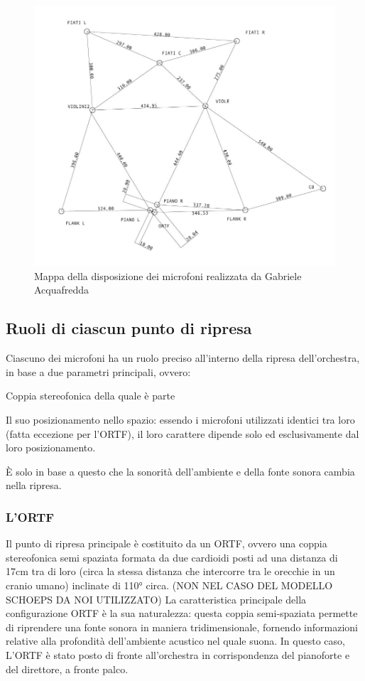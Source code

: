 \begin{figure}[t]
	\centering
	\includegraphics[width=.47\textwidth]{img/image2.jpg}
	\caption{Mappa della disposizione dei microfoni realizzata da Gabriele Acquafredda}
	\label{gs}
\end{figure}

\subsection{Ruoli di ciascun punto di ripresa}
Ciascuno dei microfoni ha un ruolo preciso all'interno della ripresa dell'orchestra, in base a due parametri principali, ovvero:
\begin{compactitem}
\item Coppia stereofonica della quale è parte
\item Il suo posizionamento nello spazio: essendo i microfoni utilizzati identici tra loro (fatta eccezione per l'ORTF), il loro carattere dipende solo ed esclusivamente dal loro posizionamento.
\end{compactitem}
È solo in base a questo che la sonorità dell'ambiente e della fonte sonora cambia nella ripresa.

\subsubsection{L'ORTF}
Il punto di ripresa principale è costituito da un ORTF, ovvero una coppia stereofonica semi spaziata formata da due cardioidi posti ad una distanza di 17cm tra di loro (circa la stessa distanza che intercorre tra le orecchie in un cranio umano) inclinate di 110° circa. (NON NEL CASO DEL MODELLO SCHOEPS DA NOI UTILIZZATO)
La caratteristica principale della configurazione ORTF è la sua naturalezza: questa coppia semi-spaziata permette di riprendere una fonte sonora in maniera tridimensionale, fornendo informazioni relative alla profondità dell'ambiente acustico nel quale suona.
In questo caso, L'ORTF è stato posto di fronte all'orchestra in corrispondenza del pianoforte e del direttore, a fronte palco.

